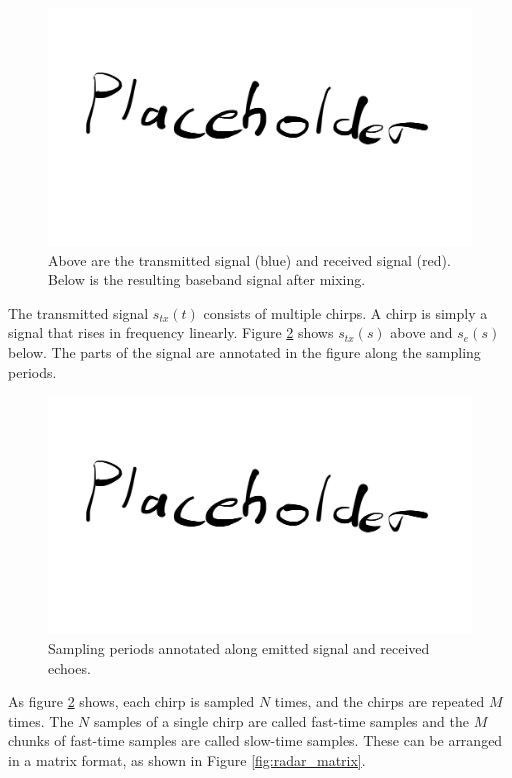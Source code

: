 \begin{figure}
    \centering
    \includegraphics[width=\textwidth]{fig/placeholder.png}
    \caption{Above are the transmitted signal (blue) and received signal (red).
        Below is the resulting baseband signal after mixing.}
    \label{fig:fmcw_mixing}
\end{figure}

The transmitted signal $s_{tx}(t)$ consists of multiple chirps.
A chirp is simply a signal that rises in frequency linearly.
Figure \ref{fig:fmcw_waveform_annotated} shows $s_{tx}(s)$ above and $s_{e}(s)$ below.
The parts of the signal are annotated in the figure along the sampling periods.

\begin{figure}
    \centering
    \includegraphics[width=\textwidth]{fig/placeholder.png}
    \caption{Sampling periods annotated along emitted signal and received echoes.}
    \label{fig:fmcw_waveform_annotated}
\end{figure}

As figure \ref{fig:fmcw_waveform_annotated} shows,
each chirp is sampled $N$ times, and the chirps are repeated $M$ times.
The $N$ samples of a single chirp are called fast-time samples
and the $M$ chunks of fast-time samples are called slow-time samples.
These can be arranged in a matrix format, as shown in Figure \ref{fig:radar_matrix}.

